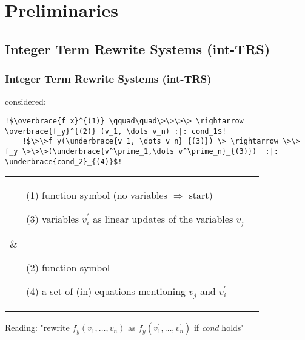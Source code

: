 \section{Preliminaries}

\subsection{Integer Term Rewrite Systems (int-TRS) }
\frame{\tableofcontents[currentsection]}
\begin{frame}[fragile] %
	\frametitle{Integer Term Rewrite Systems (int-TRS)}
	\its considered:
	\begin{lstlisting}[escapechar=!]
	!$\overbrace{f_x}^{(1)} \qquad\quad\>\>\>\> \rightarrow \overbrace{f_y}^{(2)} (v_1, \dots v_n) :|: cond_1$!
	!$\>\>f_y(\underbrace{v_1, \dots v_n}_{(3)}) \> \rightarrow \>\> f_y \>\>\>(\underbrace{v^\prime_1,\dots v^\prime_n}_{(3)})  :|: \underbrace{cond_2}_{(4)}$!
	\end{lstlisting}
	
	\begin{tabular}{ll}
		\parbox{5cm}{
		\begin{enumerate}
			\item[(1)] function symbol (no variables $\Rightarrow$ start)
			\item[(3)] variables $v^\prime_i$ as linear updates of the variables $v_j$
		\end{enumerate}}
		&
		\parbox{5cm}{
			\begin{enumerate}
				\item[(2)] function symbol
				\item[(4)] a set of (in)-equations mentioning $v_j$ and $v^\prime_i$
		\end{enumerate}}
	\end{tabular}

	Reading: "rewrite $f_y(v_1,\dots,v_n)$ as $f_y(v^\prime_1,\dots,v^\prime_n)$ if \textit{cond} holds"
\end{frame}

